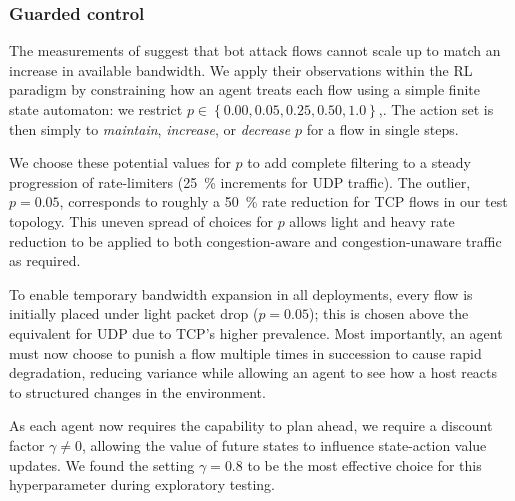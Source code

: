 \documentclass[10pt, times, comsoc]{IEEEtran}
\begin{document}
\subsubsection{Guarded control}
The measurements of \textcite{DBLP:conf/ndss/KangGS16} suggest that bot attack flows cannot scale up to match an increase in available bandwidth.
We apply their observations within the RL paradigm by constraining how an agent treats each flow using a simple finite state automaton: we restrict $p \in \left\{ 0.00, 0.05, 0.25, 0.50, 1.0 \right\}$,.
The action set is then simply to \emph{maintain}, \emph{increase}, or \emph{decrease} $p$ for a flow in single steps.

We choose these potential values for $p$ to add complete filtering to a steady progression of rate-limiters (\SI{25}{\percent} increments for UDP traffic).
The outlier, $p=0.05$, corresponds to roughly a \SI{50}{\percent} rate reduction for TCP flows in our test topology.
This uneven spread of choices for $p$ allows light and heavy rate reduction to be applied to both congestion-aware and congestion-unaware traffic as required.

To enable temporary bandwidth expansion in all deployments, every flow is initially placed under light packet drop ($p=0.05$); this is chosen above the equivalent for UDP due to TCP's higher prevalence.
Most importantly, an agent must now choose to punish a flow multiple times in succession to cause rapid degradation, reducing variance while allowing an agent to see how a host reacts to structured changes in the environment.

As each agent now requires the capability to plan ahead, we require a discount factor $\gamma \ne 0$, allowing the value of future states to influence state-action value updates.
We found the setting $\gamma = 0.8$ to be the most effective choice for this hyperparameter during exploratory testing.
\end{document}
